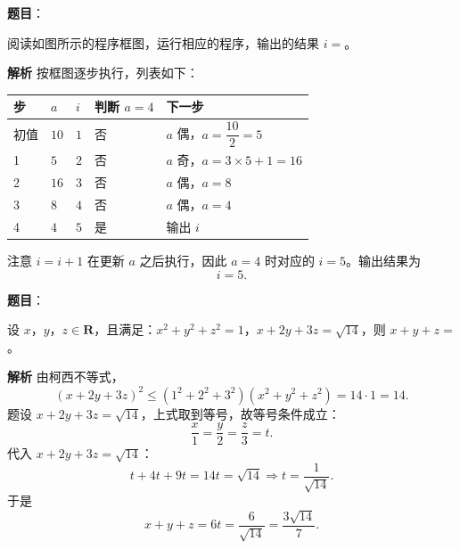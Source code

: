 \begin{answer}

\textbf{题目}：

阅读如图所示的程序框图，运行相应的程序，输出的结果 $i=$\gkblank{}。
\nopagebreak[4]
\begin{center}\end{center}
\nopagebreak[4]
\textbf{解析}
按框图逐步执行，列表如下：

\begin{center}
\begin{tabular}{lllll}
\toprule
步 & $a$ & $i$ & 判断 $a=4$ & 下一步 \\
\midrule
初值 & $10$ & $1$ & 否 & $a$ 偶，$a=\dfrac{10}{2}=5$ \\
1 & $5$ & $2$ & 否 & $a$ 奇，$a=3\times5+1=16$ \\
2 & $16$ & $3$ & 否 & $a$ 偶，$a=8$ \\
3 & $8$ & $4$ & 否 & $a$ 偶，$a=4$ \\
4 & $4$ & $5$ & 是 & 输出 $i$ \\
\bottomrule
\end{tabular}
\end{center}

注意 $i=i+1$ 在更新 $a$ 之后执行，因此 $a=4$ 时对应的 $i=5$。输出结果为
\nopagebreak[4]
\[i=5.\]


\end{answer}
\begin{answer}

\textbf{题目}：

设 $x$，$y$，$z\in\mathbf R$，且满足：$x^2+y^2+z^2=1$，$x+2y+3z=\sqrt{14}$，则 $x+y+z=$\gkblank{}。

\textbf{解析}
由柯西不等式，
\nopagebreak[4]
\[(x+2y+3z)^2\leqslant\left(1^2+2^2+3^2\right)\left(x^2+y^2+z^2\right)=14\cdot1=14.\]
题设 $x+2y+3z=\sqrt{14}$，上式取到等号，故等号条件成立：
\nopagebreak[4]
\[\frac x1=\frac y2=\frac z3=t.\]
代入 $x+2y+3z=\sqrt{14}$：
\nopagebreak[4]
\[t+4t+9t=14t=\sqrt{14}\Longrightarrow t=\frac1{\sqrt{14}}.\]
于是
\nopagebreak[4]
\[x+y+z=6t=\frac6{\sqrt{14}}=\frac{3\sqrt{14}}{7}.\]


\end{answer}

